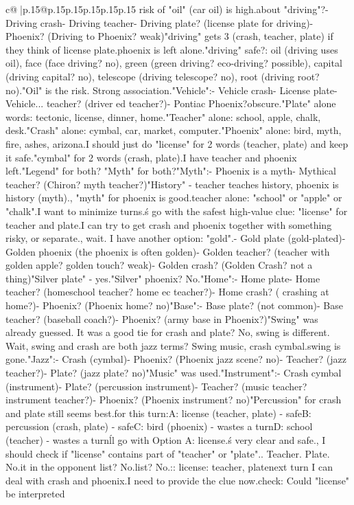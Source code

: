 \documentclass{article}
\begin{document}
{\begin{supertabular}{c@{$\;$}|p{.15\linewidth}@{}p{.15\linewidth}p{.15\linewidth}p{.15\linewidth}p{.15\linewidth}p{.15\linewidth}}
{{{risk of "oil" (car oil) is high.\n\nWhat about "driving"?\n- Driving crash\n- Driving teacher\n- Driving plate? (license plate for driving)\n- Phoenix? (Driving to Phoenix? weak)\n\nSo "driving" gets 3 (crash, teacher, plate) if they think of license plate.\nThen phoenix is left alone.\nIs "driving" safe?\nOpponent: oil (driving uses oil), face (face driving? no), green (green driving? eco-driving? possible), capital (driving capital? no), telescope (driving telescope? no), root (driving root? no).\n"Oil" is the risk. Strong association.\n\n"Vehicle":\n- Vehicle crash\n- License plate\n- Vehicle... teacher? (driver ed teacher?)\n- Pontiac Phoenix?\nToo obscure.\n\n"Plate" alone words: tectonic, license, dinner, home.\n"Teacher" alone: school, apple, chalk, desk.\n"Crash" alone: cymbal, car, market, computer.\n"Phoenix" alone: bird, myth, fire, ashes, arizona.\n\nMaybe I should just do "license" for 2 words (teacher, plate) and keep it safe.\n\nOr "cymbal" for 2 words (crash, plate).\nThen I have teacher and phoenix left.\n"Legend" for both? "Myth" for both?\n"Myth":\n- Phoenix is a myth\n- Mythical teacher? (Chiron? myth teacher?)\n"History" - teacher teaches history, phoenix is history (myth).\n\nActually, "myth" for phoenix is good.\nThen teacher alone: "school" or "apple" or "chalk".\n\nBut I want to minimize turns.\n\nLet\'s go with the safest high-value clue: "license" for teacher and plate.\nThen I can try to get crash and phoenix together with something risky, or separate.\n\nActually, wait. I have another option: "gold".\n- Gold plate (gold-plated)\n- Golden phoenix (the phoenix is often golden)\n- Golden teacher? (teacher with golden apple? golden touch? weak)\n- Golden crash? (Golden Crash? not a thing)\n\n"Silver plate" - yes.\n"Silver" phoenix? No.\n\n"Home":\n- Home plate\n- Home teacher? (homeschool teacher? home ec teacher?)\n- Home crash? ( crashing at home?)\n- Phoenix? (Phoenix home? no)\n\n"Base":\n- Base plate? (not common)\n- Base teacher? (baseball coach?)\n- Phoenix? (army base in Phoenix?)\n\n"Swing" was already guessed. It was a good tie for crash and plate? No, swing is different. Wait, swing and crash are both jazz terms? Swing music, crash cymbal.\nBut swing is gone.\n\n"Jazz":\n- Crash (cymbal)\n- Phoenix? (Phoenix jazz scene? no)\n- Teacher? (jazz teacher?)\n- Plate? (jazz plate? no)\n\n"Music" was used.\n\n"Instrument":\n- Crash cymbal (instrument)\n- Plate? (percussion instrument)\n- Teacher? (music teacher? instrument teacher?)\n- Phoenix? (Phoenix instrument? no)\n\n"Percussion" for crash and plate still seems best.\n\nSo for this turn:\nOption A: license (teacher, plate) - safe\nOption B: percussion (crash, plate) - safe\nOption C: bird (phoenix) - wastes a turn\nOption D: school (teacher) - wastes a turn\n\nI\'ll go with Option A: license.\nIt\'s very clear and safe.\n\nWait, I should check if "license" contains part of "teacher" or "plate".\nLicense. Teacher. Plate. No.\nIs it in the opponent list? No.\nDistractor list? No.\n\nSo:\nCLUE: license\nTARGETS: teacher, plate\n\nThen next turn I can deal with crash and phoenix.\n\nBut I need to provide the clue now.\n\nFinal check: Could "license" be interpreted }}}
\end{supertabular}}
\end{document}
